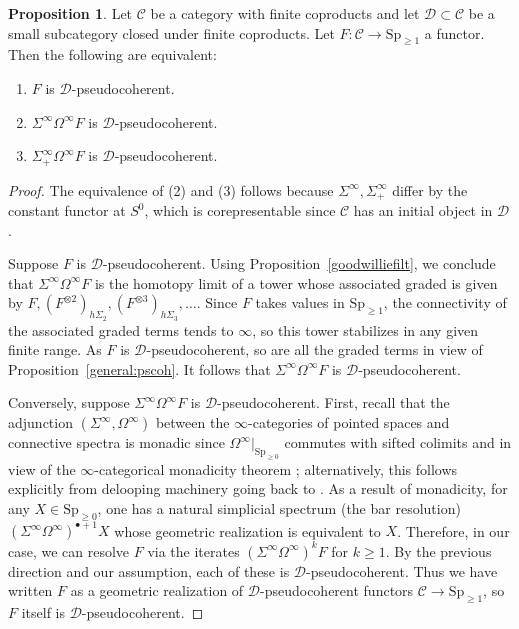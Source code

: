 \documentclass{amsart}
\newcommand{\Sp}{\mathrm{Sp}}
\theoremstyle{definition}
\newtheorem{proposition}[definition]{Proposition}
\begin{document}
\begin{proposition} 
\label{suspensionpscoh}
Let $\mathcal{C}$ be a category with finite coproducts and 
let $\mathcal{D} \subset \mathcal{C}$ be a small subcategory closed under
finite coproducts. 
Let
$F: \mathcal{C}
\to \Sp_{\geq 1}$ a functor. Then the following are equivalent: 
\begin{enumerate}
\item  
$F$ is $\mathcal{D}$-pseudocoherent. 
\item
$\Sigma^\infty \Omega^\infty F$ is $\mathcal{D}$-pseudocoherent. 
\item 
$\Sigma^\infty_+ \Omega^\infty F$ is $\mathcal{D}$-pseudocoherent.
\end{enumerate}
\end{proposition} 
\begin{proof} 
The equivalence of (2) and (3) follows because $\Sigma^\infty, \Sigma^\infty_+$
differ by the constant functor at $S^0$, which is corepresentable since
$\mathcal{C}$ has an initial object in $\mathcal{D}$.

Suppose $F$ is $\mathcal{D}$-pseudocoherent. 
Using Proposition~\ref{goodwilliefilt}, 
we conclude that $\Sigma^\infty \Omega^\infty F$ is the homotopy limit of a
tower whose associated graded is given by $F, (F^{\otimes 2})_{h
\Sigma_2}, (F^{\otimes 3})_{h \Sigma_3 }, \dots $. 
Since $F$ takes values in $\Sp_{\geq 1}$, the connectivity of the associated graded terms
tends to $\infty$, so this tower stabilizes in any given finite range. As $F$
is $\mathcal{D}$-pseudocoherent, so are all the graded terms in
view of Proposition~\ref{general:pscoh}. It follows that $\Sigma^\infty \Omega^\infty F$ is
$\mathcal{D}$-pseudocoherent. 

Conversely, suppose $\Sigma^\infty \Omega^\infty F$ is
$\mathcal{D}$-pseudocoherent. 
First, recall that the adjunction $(\Sigma^\infty, \Omega^\infty)$
between the $\infty$-categories of pointed spaces and connective spectra is monadic since
$\Omega^\infty|_{\Sp_{\geq 0}}$ commutes with sifted colimits \cite[Prop.~1.4.3.9]{HA} and in view of the $\infty$-categorical monadicity theorem
\cite[Sec.~4.7.3]{HA}; 
alternatively, this follows explicitly from delooping
machinery going back to \cite{Maygeom}.  
As a result of monadicity, for any $X \in \Sp_{\geq 0}$, one has a natural simplicial spectrum
(the bar resolution) $(\Sigma^\infty \Omega^\infty)^{\bullet + 1} X$ whose
geometric realization is equivalent to $X$.  
Therefore, in our case, we can
resolve $F$ via the iterates $(\Sigma^\infty \Omega^\infty)^k F$ for $k \geq 1$.
By the previous direction and our assumption, each of these is
$\mathcal{D}$-pseudocoherent.
Thus we have written $F$ as a geometric realization of
$\mathcal{D}$-pseudocoherent
functors $\mathcal{C} \to \Sp_{\geq 1}$,
so $F$ itself is $\mathcal{D}$-pseudocoherent. 
\end{proof} 
\end{document}
